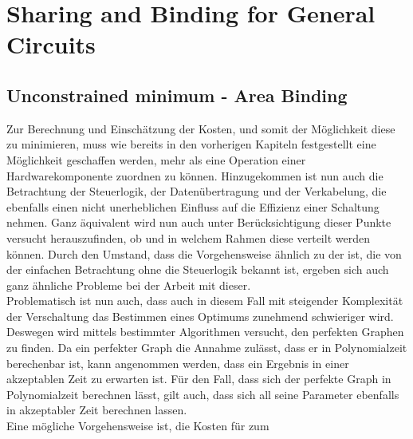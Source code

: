\documentclass[conference]{IEEEtran}
\begin{document}
\section{Sharing and Binding for General Circuits}
\subsection{Unconstrained minimum - Area Binding}
Zur Berechnung und Einschätzung der Kosten, und somit
der Möglichkeit diese zu minimieren, muss wie bereits in den
vorherigen Kapiteln festgestellt eine Möglichkeit geschaffen
werden, mehr als eine Operation einer Hardwarekomponente
zuordnen zu können. Hinzugekommen ist nun auch die
Betrachtung der Steuerlogik, der Datenübertragung und der
Verkabelung, die ebenfalls einen nicht unerheblichen Einfluss
auf die Effizienz einer Schaltung nehmen. Ganz äquivalent
wird nun auch unter Berücksichtigung dieser Punkte versucht
herauszufinden, ob und in welchem Rahmen diese verteilt
werden können. Durch den Umstand, dass die Vorgehensweise
ähnlich zu der ist, die von der einfachen Betrachtung ohne
die Steuerlogik bekannt ist, ergeben sich auch ganz ähnliche
Probleme bei der Arbeit mit dieser.\\
Problematisch ist nun auch, dass auch in diesem Fall mit
steigender Komplexität der Verschaltung das Bestimmen
eines Optimums zunehmend schwieriger wird. Deswegen
wird mittels bestimmter Algorithmen versucht, den perfekten
Graphen zu finden. Da ein perfekter Graph die Annahme
zulässt, dass er in Polynomialzeit berechenbar ist, kann angenommen werden, dass ein Ergebnis in einer akzeptablen
Zeit zu erwarten ist. Für den Fall, dass sich der perfekte
Graph in Polynomialzeit berechnen lässt, gilt auch, dass sich
all seine Parameter ebenfalls in akzeptabler Zeit berechnen
lassen\cite[S. 60]{6}.\\
Eine mögliche Vorgehensweise ist, die Kosten für zum
\end{document}
